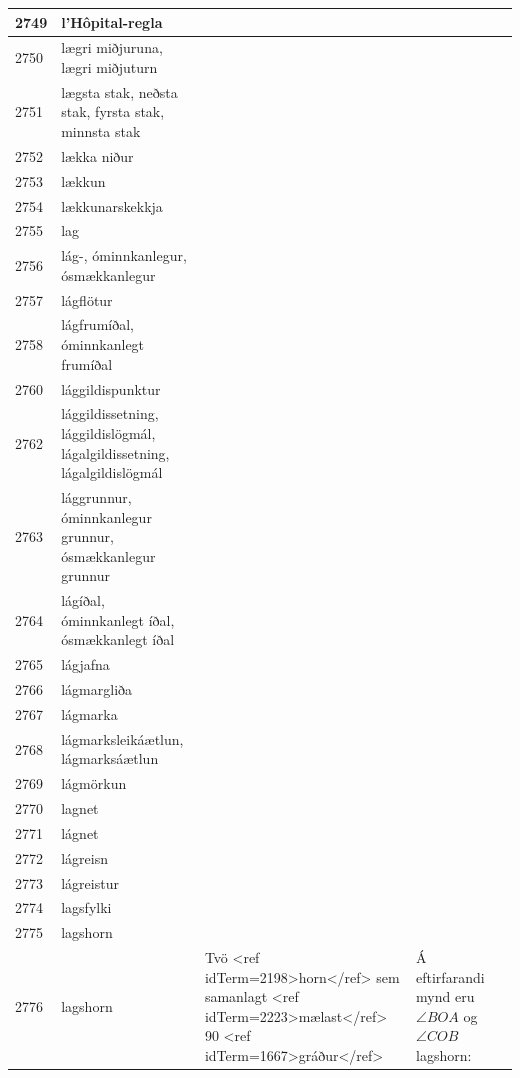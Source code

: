 \begin{longtable}{p{}|p{}|p{}|p{}|p{}}
\hline
2749 & l'Hôpital-regla &  &  &  \\
\hline
2750 & lægri miðjuruna, lægri miðjuturn &  &  &  \\
\hline
2751 & lægsta stak, neðsta stak, fyrsta stak, minnsta stak &  &  &  \\
\hline
2752 & lækka niður &  &  &  \\
\hline
2753 & lækkun &  &  &  \\
\hline
2754 & lækkunarskekkja &  &  &  \\
\hline
2755 & lag &  &  &  \\
\hline
2756 & lág-, óminnkanlegur, ósmækkanlegur &  &  &  \\
\hline
2757 & lágflötur &  &  &  \\
\hline
2758 & lágfrumíðal, óminnkanlegt frumíðal &  &  &  \\
\hline
2760 & lággildispunktur &  &  &  \\
\hline
2762 & lággildissetning, lággildislögmál, lágalgildissetning, lágalgildislögmál &  &  &  \\
\hline
2763 & lággrunnur, óminnkanlegur grunnur, ósmækkanlegur grunnur &  &  &  \\
\hline
2764 & lágíðal, óminnkanlegt íðal, ósmækkanlegt íðal &  &  &  \\
\hline
2765 & lágjafna &  &  &  \\
\hline
2766 & lágmargliða &  &  &  \\
\hline
2767 & lágmarka &  &  &  \\
\hline
2768 & lágmarksleikáætlun, lágmarksáætlun &  &  &  \\
\hline
2769 & lágmörkun &  &  &  \\
\hline
2770 & lagnet &  &  &  \\
\hline
2771 & lágnet &  &  &  \\
\hline
2772 & lágreisn &  &  &  \\
\hline
2773 & lágreistur &  &  &  \\
\hline
2774 & lagsfylki &  &  &  \\
\hline
2775 & lagshorn &  &  &  \\
\hline
2776 & lagshorn & Tvö <ref idTerm=2198>horn</ref> sem samanlagt <ref idTerm=2223>mælast</ref> 90 <ref idTerm=1667>gráður</ref> & Á eftirfarandi mynd eru $\angle BOA$ og $\angle COB$ lagshorn:


\end{longtable}
